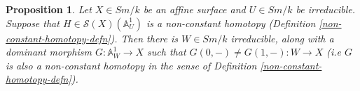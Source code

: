 \documentclass[11pt, reqno]{amsart}
\theoremstyle{plain}
\newtheorem{proposition}[thm]{Proposition}
\theoremstyle{definition}
\begin{document}
 
\begin{proposition} \label{ghost homotopy implies dominant 1}
Let $X \in Sm/k$ be an 
affine surface and $U \in Sm/k$ be irreducible. 
Suppose that $H \in \mathcal{S}(X)(\mathbb{A}^1_U)$ is a non-constant homotopy (Definition \ref{non-constant-homotopy-defn}).
Then there is $W \in Sm/k$ irreducible, along with a dominant morphism $G: \mathbb{A}^1_W \to X$ such that $G(0,-) \neq G(1, -): W \to X$ (i.e $G$ is also a non-constant homotopy in the sense of Definition \ref{non-constant-homotopy-defn}). 
\end{proposition}
\end{document}
